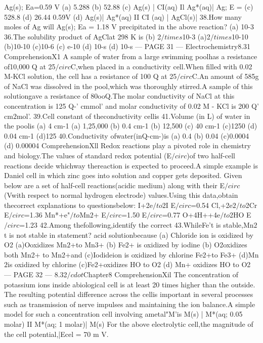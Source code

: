 \begin{problembox}
[Ag+]
Ag(s); Ea=0.59 V
(a) 5.288
(b) 52.88
(c) Ag(s) | CI(aq) Il Ag*(aq)| Ag; E =
(c) 528.8
(d) 26.44
0.59V
(d) Ag(s)| Ag*(aq) II CI (aq) | AgCl(s)|
38.How many moles of Ag will
Ag(s); Ea = 1.18 V
precipitated in the above reaction?
(a) 10-3
36.The solubility product of AgClat 298 K is
(b) 2$/times$10-3
(a)2$/times$10-10
(b)10-10
(c)10-6
(c) e-10
(d) 10-s
(d) 10-s
--- PAGE 31 ---
Electrochemistry8.31
ComprehensionX1
A sample of water from a large swimming poolhas a resistance of10,000 Q at 25$/circ$C,when placed
in a conductivity cell.When filled with 0.02 M-KCl solution, the cell has a resistance of 100 Q at
25$/circ$C.An amount of 585g of NaCl was dissolved in the pool,which was thoroughly stirred.A sample
of this solutiongave a resistance of 80ooQ.The molar conductivity of NaCl at this concentration is
125 Q-' cmmol' and molar conductivity of 0.02 M - KCl is 200 Q' cm$2$mol'.
39.Cell constant of theconductivity cellis
41.Volume (in L) of water in the poolis
(a) 4 cm-1
(a) 1,25,000
(b) 0.4 cm-1
(b) 12,500
(c) 40 cm-1
(c)1250
(d) 0.04 cm-1
(d)125
40.Conductivity ofwater(inQ-cm-)is
(a) 0.4
(b) 0.04
(c)0.0004
(d) 0.00004
ComprehensionXll
Redox reactions play a pivoted role in chemistry and biology.The values of standard redox potential
(E$/circ$)of two half-cell reactions decide whichway thereaction is expected to proceed.A simple example
is Daniel cell in which zinc goes into solution and copper gets deposited. Given below are a set of
half-cell reactions(acidic medium) along with their E$/circ$(Vwith respect to normal hydrogen electrode)
values.Using this data,obtain thecorrect explanations to questionsbelow:
I+2e$/to$2I
E$/circ$=0.54
Cl,+2e$2$$/to$2Cr
E$/circ$=1.36
Mn*+e"$/to$Mn$2$+
E$/circ$=1.50
E$/circ$=0.77
O+4H++4e$/to$2HO
E$/circ$=1.23
42.Among thefollowing,identify the correct
43.WhileFe't is stable,Mn$2$t is not stable in
statement?
acid solutionbecause
(a) Chloride ion is oxidized by O2
(a)Ooxidizes Mn$2$+to Mn3+
(b) Fe$2$+ is oxidized by iodine
(b) O2oxidizes both Mn2+ to Mn$2$+and
(c)Iodideion is oxidized by chlorine
Fe$2$+to Fe3+
(d)Mn$2$is oxidized by chlorine
(c)Fe$2$+oxidizes HO to O2
(d) Mn+ oxidizes HO to O2
--- PAGE 32 ---
8.32$/cdot$Chapter8
ComprehensionXil
The concentration of potassium ions inside abiological cell is at least 20 times higher than the outside.
The resulting potential difference across the cellis important in several processes such as transmission
of nerve impulses and maintaining the ion balance.A simple model for such a concentration cell
involving ametal"M'is
M(s) | M*(aq; 0.05 molar) II M*(aq; 1 molar)| M(s)
For the above electrolytic cell,the magnitude of the cell potential,|Ecel = 70 m V.
$$
\end{problembox}
